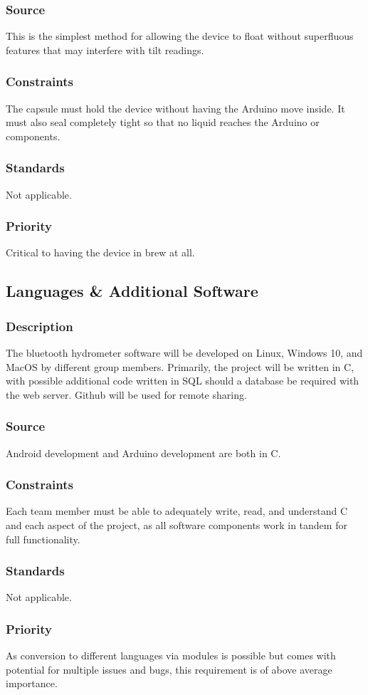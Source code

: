 \subsubsection{Source}
This is the simplest method for allowing the device to float without superfluous features that may interfere with tilt readings.
\subsubsection{Constraints}
The capsule must hold the device without having the Arduino move inside. It must also seal completely tight so that no liquid reaches the Arduino or components.
\subsubsection{Standards}
Not applicable.
\subsubsection{Priority}
Critical to having the device in brew at all.
\subsection{Languages \& Additional Software}
\subsubsection{Description}
The bluetooth hydrometer software will be developed on Linux, Windows 10, and MacOS by different group members. Primarily, the project will be written in C, with possible additional code written in SQL should a database be required with the web server. Github will be used for remote sharing.
\subsubsection{Source}
Android development and Arduino development are both in C.
\subsubsection{Constraints}
Each team member must be able to adequately write, read, and understand C and each aspect of the project, as all software components work in tandem for full functionality. 
\subsubsection{Standards}
Not applicable.
\subsubsection{Priority}
As conversion to different languages via modules is possible but comes with potential for multiple issues and bugs, this requirement is of above average importance.